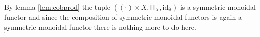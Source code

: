 \begin{prf}
By lemma \ref{lem:cobprod} the tuple $((\cdot) \times X,\mathsf{H}_{X},\mathrm{id}_{\emptyset})$ is a symmetric monoidal functor and since the composition of symmetric monoidal functors is again a symmetric monoidal functor there is nothing more to do here.
\\
\phantom{proven}
\hfill
$\square$
\end{prf}
